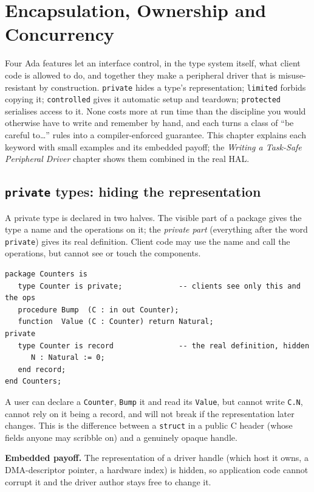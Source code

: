 \chapter{Encapsulation, Ownership and Concurrency}
\label{ch:encap}

Four Ada features let an interface control, in the type system itself, what client
code is allowed to do, and together they make a peripheral driver that is
misuse-resistant by construction. \texttt{private} hides a type's representation;
\texttt{limited} forbids copying it; \texttt{controlled} gives it automatic setup
and teardown; \texttt{protected} serialises access to it. None costs more at run
time than the discipline you would otherwise have to write and remember by hand,
and each turns a class of ``be careful to\ldots'' rules into a compiler-enforced
guarantee. This chapter explains each keyword with small examples and its embedded
payoff; the \emph{Writing a Task-Safe Peripheral Driver} chapter shows them
combined in the real HAL.

\section{\texttt{private} types: hiding the representation}

A private type is declared in two halves. The visible part of a package gives the
type a name and the operations on it; the \emph{private part} (everything after
the word \texttt{private}) gives its real definition. Client code may use the
name and call the operations, but cannot see or touch the components.

\begin{lstlisting}
package Counters is
   type Counter is private;             -- clients see only this and the ops
   procedure Bump  (C : in out Counter);
   function  Value (C : Counter) return Natural;
private
   type Counter is record               -- the real definition, hidden
      N : Natural := 0;
   end record;
end Counters;
\end{lstlisting}

A user can declare a \texttt{Counter}, \texttt{Bump} it and read its
\texttt{Value}, but cannot write \texttt{C.N}, cannot rely on it being a record,
and will not break if the representation later changes. This is the difference
between a \texttt{struct} in a public C header (whose fields anyone may scribble
on) and a genuinely opaque handle.

\textbf{Embedded payoff.} The representation of a driver handle (which host it
owns, a DMA-descriptor pointer, a hardware index) is hidden, so application code
cannot corrupt it and the driver author stays free to change it.

